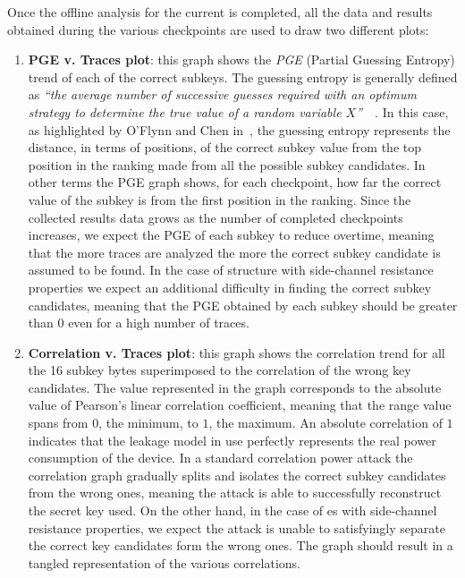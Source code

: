         Once the offline analysis for the current \sbocs{} is completed, all the data and results obtained during the various checkpoints are used to draw two different plots:
        
        \begin{enumerate}
            \item \textbf{PGE v. Traces plot}: this graph shows the \emph{PGE} (Partial Guessing Entropy) trend of each of the correct subkeys. The guessing entropy is generally defined as \emph{``the average number of successive guesses required with an optimum strategy to determine the true value of a random variable $X$''}~\cite{massey1994guessing}~\cite{o2015synchronous}. In this case, as highlighted by O'Flynn and Chen in~\cite{o2015synchronous}, the guessing entropy represents the distance, in terms of positions, of the correct subkey value from the top position in the ranking made from all the possible subkey candidates. In other terms the PGE graph shows, for each checkpoint, how far the correct value of the subkey is from the first position in the ranking. Since the collected results data grows as the number of completed checkpoints increases, we expect the PGE of each subkey to reduce overtime, meaning that the more traces are analyzed the more the correct subkey candidate is assumed to be found. In the case of \sbocs{} structure with side-channel resistance properties we expect an additional difficulty in finding the correct subkey candidates, meaning that the PGE obtained by each subkey should be greater than $0$ even for a high number of traces.
            \item \textbf{Correlation v. Traces plot}: this graph shows the correlation trend for all the 16 subkey bytes superimposed to the correlation of the wrong key candidates. The value represented in the graph corresponds to the absolute value of Pearson's linear correlation coefficient, meaning that the range value spans from $0$, the minimum, to $1$, the maximum. An absolute correlation of $1$ indicates that the leakage model in use perfectly represents the real power consumption of the device. In a standard correlation power attack the correlation graph gradually splits and isolates the correct subkey candidates from the wrong ones, meaning the attack is able to successfully reconstruct the secret key used. On the other hand, in the case of \sbocs{}es with side-channel resistance properties, we expect the attack is unable to satisfyingly separate the correct key candidates form the wrong ones. The graph should result in a tangled representation of the various correlations.
        \end{enumerate}

